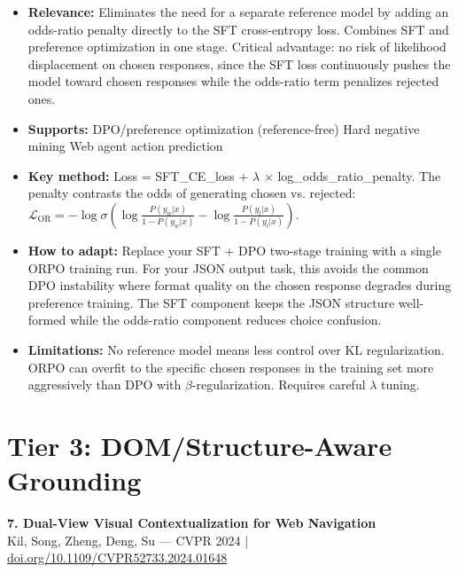 \documentclass[pdflatex,sn-mathphys-num]{sn-jnl}
\theoremstyle{thmstyleone}
\theoremstyle{thmstyletwo}
\theoremstyle{thmstylethree}
\begin{document}
\begin{itemize}
    \item \textbf{Relevance:} Eliminates the need for a separate reference model by adding an odds-ratio penalty directly to the SFT cross-entropy loss. Combines SFT and preference optimization in one stage. Critical advantage: no risk of likelihood displacement on chosen responses, since the SFT loss continuously pushes the model toward chosen responses while the odds-ratio term penalizes rejected ones.
    \item \textbf{Supports:} \checkmark DPO/preference optimization (reference-free) \checkmark Hard negative mining \checkmark Web agent action prediction
    \item \textbf{Key method:} Loss = SFT\_CE\_loss + $\lambda$ $\times$ log\_odds\_ratio\_penalty. The penalty contrasts the odds of generating chosen vs. rejected: $\mathcal{L}_\text{OR} = -\log \sigma\left(\log \frac{P(y_w|x)}{1-P(y_w|x)} - \log \frac{P(y_l|x)}{1-P(y_l|x)}\right)$.
    \item \textbf{How to adapt:} Replace your SFT + DPO two-stage training with a single ORPO training run. For your JSON output task, this avoids the common DPO instability where format quality on the chosen response degrades during preference training. The SFT component keeps the JSON structure well-formed while the odds-ratio component reduces choice confusion.
    \item \textbf{Limitations:} No reference model means less control over KL regularization. ORPO can overfit to the specific chosen responses in the training set more aggressively than DPO with $\beta$-regularization. Requires careful $\lambda$ tuning.
\end{itemize}

\section{Tier 3: DOM/Structure-Aware Grounding}

\textbf{7. Dual-View Visual Contextualization for Web Navigation} \\
Kil, Song, Zheng, Deng, Su --- CVPR 2024 | \href{https://ieeexplore.ieee.org/document/10656291/}{doi.org/10.1109/CVPR52733.2024.01648}
\end{document}
